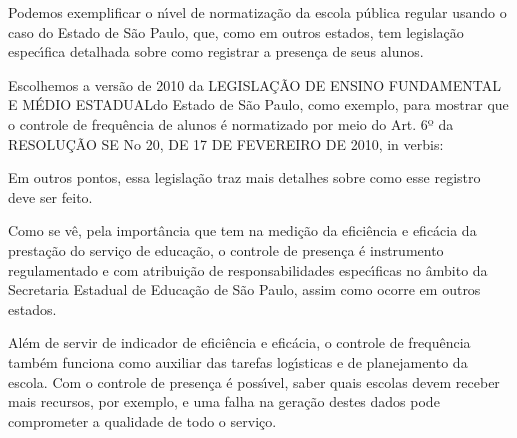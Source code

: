 \documentclass[
12pt,		%
openright,	%
twoside,  %
a4paper,			%
chapter=TITLE,		%
english,			%
french,				%
spanish,			%
brazil				%
]{USPSC-classe/USPSC}
\begin{document}
Podemos exemplificar o n\'{\i}vel de normatiza\c{c}\~ao da escola p\'ublica regular usando o caso do Estado de S\~ao Paulo, que, como em outros estados, tem legisla\c{c}\~ao espec\'{\i}fica detalhada sobre como registrar a presen\c{c}a de seus alunos.









Escolhemos a vers\~ao de 2010 da \textquotedbl LEGISLA\c{C}\~AO DE ENSINO FUNDAMENTAL E M\'EDIO ESTADUAL\textquotedbl  do Estado de S\~ao Paulo, como exemplo, para mostrar que o controle de frequ\^encia de alunos \'e normatizado por meio do Art. 6º da RESOLU\c{C}\~AO SE No 20, DE 17 DE FEVEREIRO DE 2010, in verbis:










\noindent\begin{center}\mbox{\centering{}}\end{center}


Em outros pontos, essa legisla\c{c}\~ao traz mais detalhes sobre como esse registro deve ser feito.









Como se v\^e, pela import\^ancia que tem na medi\c{c}\~ao da efici\^encia e efic\'acia da presta\c{c}\~ao do servi\c{c}o de educa\c{c}\~ao, o controle de presen\c{c}a \'e instrumento regulamentado e com atribui\c{c}\~ao de responsabilidades espec\'{\i}ficas no \^ambito da Secretaria Estadual de Educa\c{c}\~ao de S\~ao Paulo, assim como ocorre em outros estados.









Al\'em de servir de indicador de efici\^encia e efic\'acia, o controle de frequ\^encia tamb\'em funciona como auxiliar das tarefas log\'{\i}sticas e de planejamento da escola. Com o controle de presen\c{c}a \'e poss\'{\i}vel, saber quais escolas devem receber mais recursos, por exemplo, e uma falha na gera\c{c}\~ao destes dados pode comprometer a qualidade de todo o servi\c{c}o.
\end{document}
